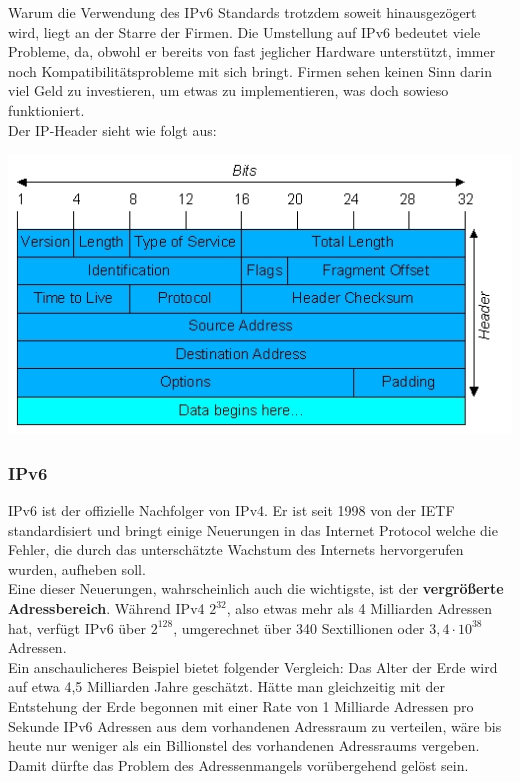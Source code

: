 \documentclass[12pt,a4paper]{report}
\begin{document}
Warum die Verwendung des IPv6 Standards trotzdem soweit hinausgezögert wird, liegt an der Starre der Firmen. Die Umstellung auf IPv6 bedeutet viele Probleme, da, obwohl er bereits von fast jeglicher Hardware unterstützt, immer noch Kompatibilitätsprobleme mit sich bringt. Firmen sehen keinen Sinn darin viel Geld zu investieren, um etwas zu implementieren, was doch sowieso funktioniert.\\

Der IP-Header sieht wie folgt aus:\\
\begin{center}
\includegraphics[scale=1]{../docs/tarkes/pics/ipheader.jpg}
\end{center}
\subsubsection{IPv6}
IPv6 ist der offizielle Nachfolger von IPv4. Er ist seit 1998 von der IETF standardisiert und bringt einige Neuerungen in das Internet Protocol welche die Fehler, die durch das unterschätzte Wachstum des Internets hervorgerufen wurden, aufheben soll.\\

Eine dieser Neuerungen, wahrscheinlich auch die wichtigste, ist der \textbf{vergrößerte Adressbereich}. Während IPv4 $2^{32}$, also etwas mehr als 4 Milliarden Adressen hat, verfügt IPv6 über $2^{128}$, umgerechnet über 340 Sextillionen oder $3,4 \cdot 10^{38}$ Adressen.\\
Ein anschaulicheres Beispiel bietet folgender Vergleich: Das Alter der Erde wird auf etwa 4,5 Milliarden Jahre geschätzt. Hätte man gleichzeitig mit der Entstehung der Erde begonnen mit einer Rate von 1 Milliarde Adressen pro Sekunde IPv6 Adressen aus dem vorhandenen Adressraum zu verteilen, wäre bis heute nur weniger als ein Billionstel des vorhandenen Adressraums vergeben.\\
Damit dürfte das Problem des Adressenmangels vorübergehend gelöst sein.\\
\end{document}
